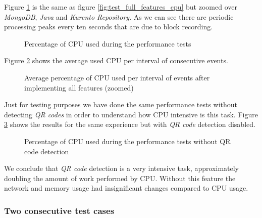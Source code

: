 Figure \ref{fig:test_full_features_cpu_zoom} is the same as figure \ref{fig:test_full_features_cpu} but zoomed over \emph{MongoDB}, \emph{Java} and \emph{Kurento Repository}. As we can see there are periodic processing peaks every ten seconds that are due to block recording. 

\begin{figure}[!htb]
  \begin{center}
    
  \end{center}
  \caption{Percentage of CPU used during the performance tests}
  \label{fig:test_full_features_cpu_zoom}
\end{figure}

   Figure \ref{fig:summary_full_cpu} shows the average used \ac{CPU} per interval of consecutive events. 

\begin{figure}[!htb]
  \begin{center}
    
  \end{center}
  \caption{Average percentage of CPU used per interval of events after implementing all features (zoomed)}
  \label{fig:summary_full_cpu}
\end{figure}

  Just for testing purposes we have done the same performance tests without detecting \emph{QR codes} in order to understand how \ac{CPU} intensive is this task. Figure \ref{fig:test_without_qrcode_cpu} shows the results for the same experience but with \emph{QR code} detection disabled.

  \begin{figure}[!htb]
  \begin{center}
    
  \end{center}
  \caption{Percentage of CPU used during the performance tests without QR code detection}
  \label{fig:test_without_qrcode_cpu}
\end{figure}

We conclude that \emph{QR code} detection is a very intensive task, approximately doubling the amount of work performed by \ac{CPU}. Without this feature the network and memory usage had insignificant changes compared to \ac{CPU} usage.

\subsubsection{Two consecutive test cases}


